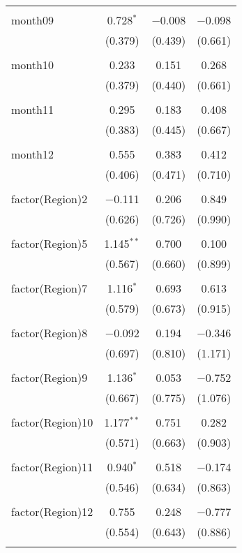 \begin{table}[!htbp]
\begin{tabular}{@{\extracolsep{5pt}}lccc}
  & & & \\ 
 month09 & 0.728$^{*}$ & $-$0.008 & $-$0.098 \\ 
  & (0.379) & (0.439) & (0.661) \\ 
  & & & \\ 
 month10 & 0.233 & 0.151 & 0.268 \\ 
  & (0.379) & (0.440) & (0.661) \\ 
  & & & \\ 
 month11 & 0.295 & 0.183 & 0.408 \\ 
  & (0.383) & (0.445) & (0.667) \\ 
  & & & \\ 
 month12 & 0.555 & 0.383 & 0.412 \\ 
  & (0.406) & (0.471) & (0.710) \\ 
  & & & \\ 
 factor(Region)2 & $-$0.111 & 0.206 & 0.849 \\ 
  & (0.626) & (0.726) & (0.990) \\ 
  & & & \\ 
 factor(Region)5 & 1.145$^{**}$ & 0.700 & 0.100 \\ 
  & (0.567) & (0.660) & (0.899) \\ 
  & & & \\ 
 factor(Region)7 & 1.116$^{*}$ & 0.693 & 0.613 \\ 
  & (0.579) & (0.673) & (0.915) \\ 
  & & & \\ 
 factor(Region)8 & $-$0.092 & 0.194 & $-$0.346 \\ 
  & (0.697) & (0.810) & (1.171) \\ 
  & & & \\ 
 factor(Region)9 & 1.136$^{*}$ & 0.053 & $-$0.752 \\ 
  & (0.667) & (0.775) & (1.076) \\ 
  & & & \\ 
 factor(Region)10 & 1.177$^{**}$ & 0.751 & 0.282 \\ 
  & (0.571) & (0.663) & (0.903) \\ 
  & & & \\ 
 factor(Region)11 & 0.940$^{*}$ & 0.518 & $-$0.174 \\ 
  & (0.546) & (0.634) & (0.863) \\ 
  & & & \\ 
 factor(Region)12 & 0.755 & 0.248 & $-$0.777 \\ 
  & (0.554) & (0.643) & (0.886) \\ 
  & & & \\ 

\end{tabular}
\end{table}
